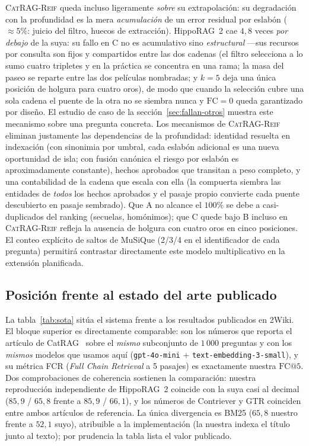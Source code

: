 \documentclass[11pt,a4paper]{article}
\newcommand{\sys}{\textsc{CatRAG-Reif}}          %
\newcommand{\hippo}{HippoRAG~2}
\begin{document}
\sys{} queda incluso ligeramente \emph{sobre} su extrapolación: su degradación
con la profundidad es la mera \emph{acumulación} de un error residual por
eslabón ($\approx 5\%$: juicio del filtro, huecos de extracción). \hippo{}
cae $4{,}8$ veces \emph{por debajo} de la suya: su fallo en C no es
acumulativo sino \emph{estructural} ---sus recursos por consulta son fijos y
compartidos entre las dos cadenas (el filtro selecciona a lo sumo cuatro
tripletes y en la práctica se concentra en una rama; la masa del paseo se
reparte entre las dos películas nombradas; y $k=5$ deja una única posición de
holgura para cuatro oros), de modo que cuando la selección cubre una sola
cadena el puente de la otra no se siembra nunca y $\mathrm{FC}=0$ queda
garantizado por diseño. El estudio de caso de la
sección~\ref{sec:fallan-otros} muestra este mecanismo sobre una pregunta
concreta. Los mecanismos de \sys{} eliminan justamente las dependencias de la
profundidad: identidad resuelta en indexación (con sinonimia por umbral, cada
eslabón adicional es una nueva oportunidad de \guillemotleft{}isla\guillemotright{}; con fusión canónica
el riesgo por eslabón es aproximadamente constante), hechos aprobados que
transitan a peso completo, y una contabilidad de la cadena que escala con
ella (la compuerta siembra las entidades de \emph{todos} los hechos
aprobados y el pasaje propio convierte cada puente descubierto en pasaje
sembrado). Que A no alcance el $100\%$ se debe a casi-duplicados del ranking
(secuelas, homónimos); que C quede bajo B incluso en \sys{} refleja la
ausencia de holgura con cuatro oros en cinco posiciones. El conteo explícito
de saltos de MuSiQue (2/3/4 en el identificador de cada pregunta) permitirá
contrastar directamente este modelo multiplicativo en la extensión
planificada.

\subsection{Posición frente al estado del arte publicado}
\label{sec:sota}

La tabla~\ref{tab:sota} sitúa el sistema frente a los resultados publicados
en 2Wiki. El bloque superior es directamente comparable: son los números
que reporta el artículo de CatRAG~\cite{catrag} sobre el \emph{mismo}
subconjunto de $1\,000$ preguntas y con los \emph{mismos} modelos que
usamos aquí (\texttt{gpt-4o-mini} + \texttt{text-embedding-3-small}), y su
métrica FCR (\emph{Full Chain Retrieval} a 5 pasajes) es exactamente
nuestra $\mathrm{FC@}5$. Dos comprobaciones de coherencia sostienen la
comparación: nuestra reproducción independiente de \hippo{} coincide con la
suya casi al decimal ($85{,}9$ / $65{,}8$ frente a $85{,}9$ / $66{,}1$), y
los números de Contriever y GTR coinciden entre ambos artículos de
referencia. La única divergencia es BM25 ($65{,}8$ nuestro frente a
$52{,}1$ suyo), atribuible a la implementación (la nuestra indexa el título
junto al texto); por prudencia la tabla lista el valor publicado.
\end{document}
